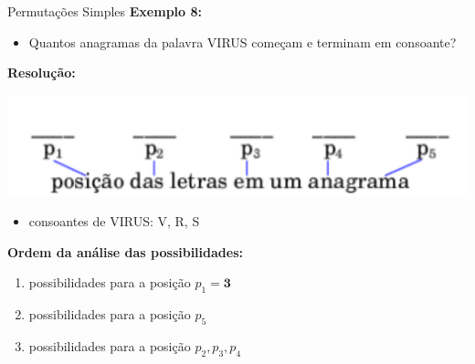\documentclass[aspectratio=169]{beamer}
\begin{document}
\begin{frame}{Permutações Simples}
    \textbf{Exemplo 8:}

    \vspace{2mm}

    \begin{itemize}
        \item[] Quantos anagramas da palavra VIRUS começam e terminam em consoante?
    \end{itemize}

    \textbf{Resolução:}

    \begin{center}
        \includegraphics[width=0.5\linewidth]{figs/Exemplo8_2.png}
    \end{center}

    
    \begin{itemize}
        \item consoantes de VIRUS: V, R, S
    \end{itemize}

    
    \textbf{Ordem da análise das possibilidades:}
    \begin{enumerate}[1)]
        \item possibilidades para a posição $p_1 = \boldsymbol{3}$ 
        \item possibilidades para a posição $p_5$ 
        \item possibilidades para a posição $p_2, p_3, p_4$
    \end{enumerate}

\end{frame}
\end{document}
